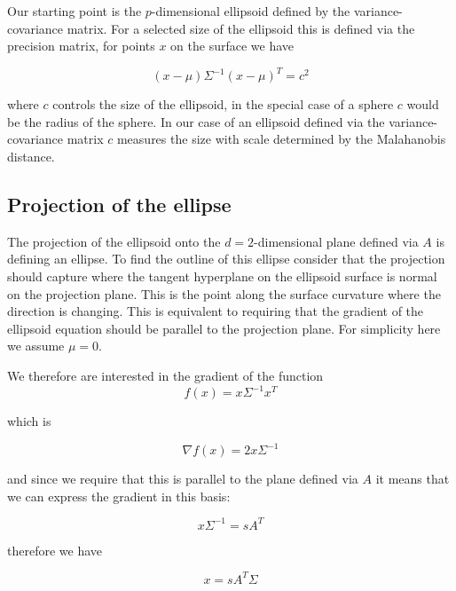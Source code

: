 \documentclass{article}
\begin{document}
Our starting point is the $p$-dimensional ellipsoid defined by the variance-covariance matrix. For a selected size of the ellipsoid this is defined via the precision matrix, for points $x$ on the surface we have

\begin{equation}
    (x-\mu)\Sigma^{-1}(x-\mu)^T = c^2
\end{equation}

where $c$ controls the size of the ellipsoid, in the special case of a sphere $c$ would be the radius of the sphere. In our case of an ellipsoid defined via the variance-covariance matrix $c$ measures the size with scale determined by the Malahanobis distance.

\subsection{Projection of the ellipse}

The projection of the ellipsoid onto the $d=2$-dimensional plane defined via $A$ is defining an ellipse. To find the outline of this ellipse consider that the projection should capture where the tangent hyperplane on the ellipsoid surface is normal on the projection plane. This is the point along the surface curvature where the direction is changing. This is equivalent to requiring that the gradient of the ellipsoid equation should be parallel to the projection plane. For simplicity here we assume $\mu=0$.

We therefore are interested in the gradient of the function
\begin{equation}
    f(x) = x \Sigma^{-1} x^T
\end{equation}

which is 

\begin{equation}
    \nabla f(x) = 2 x \Sigma^{-1}
\end{equation}

and since we require that this is parallel to the plane defined via $A$ it means that we can express the gradient in this basis:

\begin{equation}
    x \Sigma^{-1} = s A^T
\end{equation}

therefore we have

\begin{equation}
    x = s A^T \Sigma
\end{equation}
\end{document}
